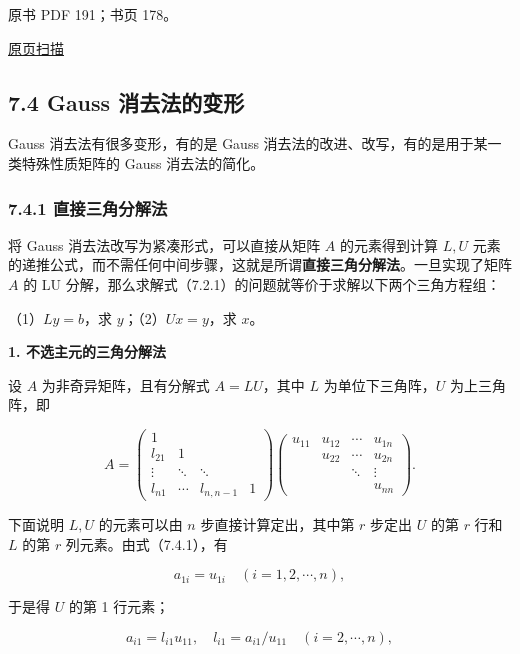 \documentclass[
  10pt,
  fontset=fandol]{ctexart}
\begin{document}
\clearpage

原书 PDF 191；书页 178。

\href{../../../source-images/pdf-191.jpeg}{原页扫描}

\subsection{7.4 Gauss 消去法的变形}\label{gauss-ux6d88ux53bbux6cd5ux7684ux53d8ux5f62}

Gauss 消去法有很多变形，有的是 Gauss 消去法的改进、改写，有的是用于某一类特殊性质矩阵的 Gauss 消去法的简化。

\subsubsection{7.4.1 直接三角分解法}\label{ux76f4ux63a5ux4e09ux89d2ux5206ux89e3ux6cd5}

将 Gauss 消去法改写为紧凑形式，可以直接从矩阵 \(A\) 的元素得到计算 \(L,U\) 元素的递推公式，而不需任何中间步骤，这就是所谓\textbf{直接三角分解法}。一旦实现了矩阵 \(A\) 的 LU 分解，那么求解式（7.2.1）的问题就等价于求解以下两个三角方程组：

（1）\(Ly=b\)，求 \(y\)；（2）\(Ux=y\)，求 \(x\)。

\textbf{1. 不选主元的三角分解法}

设 \(A\) 为非奇异矩阵，且有分解式 \(A=LU\)，其中 \(L\) 为单位下三角阵，\(U\) 为上三角阵，即

\[
A=\begin{pmatrix}
1&&&\\
l_{21}&1&&\\
\vdots&\ddots&\ddots&\\
l_{n1}&\cdots&l_{n,n-1}&1
\end{pmatrix}
\begin{pmatrix}
u_{11}&u_{12}&\cdots&u_{1n}\\
&u_{22}&\cdots&u_{2n}\\
&&\ddots&\vdots\\
&&&u_{nn}
\end{pmatrix}.
\tag{7.4.1}
\]

下面说明 \(L,U\) 的元素可以由 \(n\) 步直接计算定出，其中第 \(r\) 步定出 \(U\) 的第 \(r\) 行和 \(L\) 的第 \(r\) 列元素。由式（7.4.1），有

\[a_{1i}=u_{1i}\quad(i=1,2,\cdots,n),\]

于是得 \(U\) 的第 1 行元素；

\[a_{i1}=l_{i1}u_{11},\quad l_{i1}=a_{i1}/u_{11}\quad(i=2,\cdots,n),\]
\end{document}
